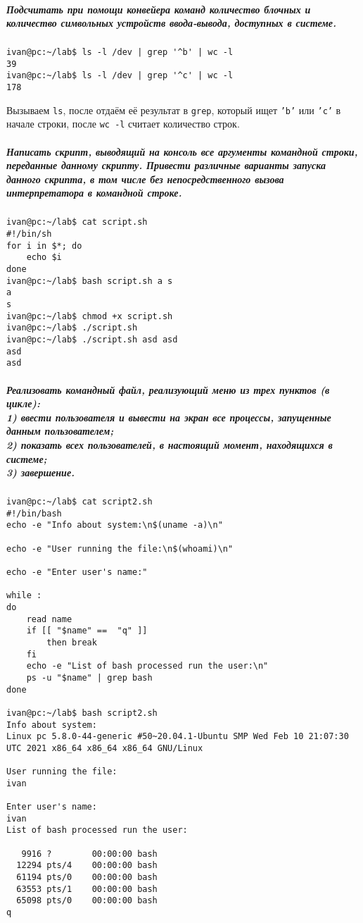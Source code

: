 \subparagraph{Подсчитать при помощи конвейера команд количество блочных и
количество символьных устройств ввода-вывода, доступных в системе.}
\begin{verbatim}
ivan@pc:~/lab$ ls -l /dev | grep '^b' | wc -l
39
ivan@pc:~/lab$ ls -l /dev | grep '^c' | wc -l
178
\end{verbatim}

Вызываем \texttt{ls}, после отдаём её результат в \texttt{grep}, который ищет \texttt{'b'} или \texttt{'c'} 
в начале строки, после \texttt{wc -l} считает количество строк.

\subparagraph{Написать скрипт, выводящий на консоль все аргументы командной
строки, переданные данному скрипту. Привести различные варианты запуска
данного скрипта, в том числе без непосредственного вызова интерпретатора в
командной строке.}
\begin{verbatim}
ivan@pc:~/lab$ cat script.sh 
#!/bin/sh
for i in $*; do
	echo $i
done
ivan@pc:~/lab$ bash script.sh a s
a
s
ivan@pc:~/lab$ chmod +x script.sh 
ivan@pc:~/lab$ ./script.sh 
ivan@pc:~/lab$ ./script.sh asd asd
asd
asd
\end{verbatim}

\subparagraph{Реализовать командный файл, реализующий меню из трех пунктов (в
цикле):\\
1) ввести пользователя и вывести на экран все процессы, запущенные
данным пользователем;\\
2) показать всех пользователей, в настоящий момент, находящихся в
системе;\\
3) завершение.}
\begin{Verbatim}[breaklines=true, breakanywhere=true]
ivan@pc:~/lab$ cat script2.sh 
#!/bin/bash
echo -e "Info about system:\n$(uname -a)\n"

echo -e "User running the file:\n$(whoami)\n"

echo -e "Enter user's name:"

while :
do
	read name
	if [[ "$name" ==  "q" ]] 
		then break
	fi
	echo -e "List of bash processed run the user:\n"
	ps -u "$name" | grep bash
done

ivan@pc:~/lab$ bash script2.sh
Info about system:
Linux pc 5.8.0-44-generic #50~20.04.1-Ubuntu SMP Wed Feb 10 21:07:30 UTC 2021 x86_64 x86_64 x86_64 GNU/Linux

User running the file:
ivan

Enter user's name:
ivan
List of bash processed run the user:

   9916 ?        00:00:00 bash
  12294 pts/4    00:00:00 bash
  61194 pts/0    00:00:00 bash
  63553 pts/1    00:00:00 bash
  65098 pts/0    00:00:00 bash
q

\end{Verbatim}